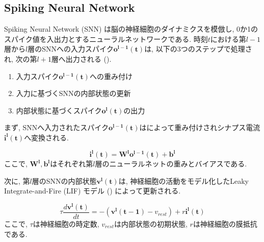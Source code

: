 \makeatletter %
\subsection{Spiking Neural Network}
Spiking Neural Network (SNN) は脳の神経細胞のダイナミクスを模倣し, 0か1のスパイク値を入出力とするニューラルネットワークである.
時刻$t$における第$l-1$層から$l$層のSNNへの入力スパイク$\bm{o^{l-1}(t)}$は, 以下の3つのステップで処理され, 次の第$l+1$層へ出力される ().

\begin{enumerate}
    \item 入力スパイク$\bm{o^{l-1}(t)}$への重み付け
    \item 入力に基づくSNNの内部状態の更新
    \item 内部状態に基づくスパイク$\bm{o^l(t)}$の出力
\end{enumerate}


まず, SNNへ入力されたスパイク$\bm{o^{l-1}(t)}$はによって重み付けされシナプス電流$\bm{i^l(t)}$へ変換される.

\begin{equation}
    \bm{i^l(t)} = \bm{W^l}\bm{o^{l-1}(t)} + \bm{b^l}
    \label{eq:input_spike}
\end{equation}
ここで, $\bm{W^l}, \bm{b^l}$はそれぞれ第$l$層のニューラルネットの重みとバイアスである.

次に, 第$l$層のSNNの内部状態$\bm{v^l(t)}$は, 神経細胞の活動をモデル化したLeaky Integrate-and-Fire (LIF) モデル () によって更新される.

\begin{equation}
    {\tau}\frac{d\bm{v^l(t)}}{dt}=-(\bm{v^l({t-1})}-v_{rest})+r\bm{i^l(t)}
    \label{eq:lif}
\end{equation}
ここで, $\tau$は神経細胞の時定数, $v_{rest}$は内部状態の初期状態, $r$は神経細胞の膜抵抗である.

